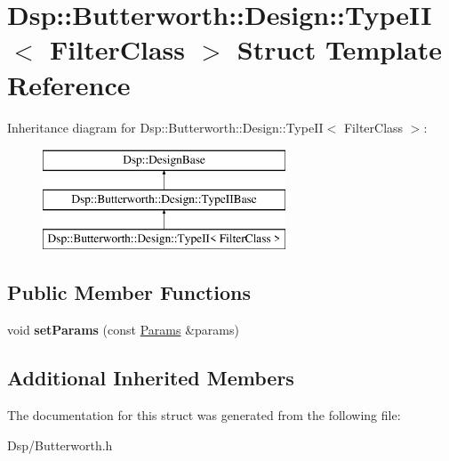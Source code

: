 \hypertarget{structDsp_1_1Butterworth_1_1Design_1_1TypeII}{\section{Dsp\-:\-:Butterworth\-:\-:Design\-:\-:Type\-I\-I$<$ Filter\-Class $>$ Struct Template Reference}
\label{structDsp_1_1Butterworth_1_1Design_1_1TypeII}
}
Inheritance diagram for Dsp\-:\-:Butterworth\-:\-:Design\-:\-:Type\-I\-I$<$ Filter\-Class $>$\-:\begin{figure}[H]
\begin{center}
\leavevmode
\includegraphics[height=3.000000cm]{structDsp_1_1Butterworth_1_1Design_1_1TypeII}
\end{center}
\end{figure}
\subsection*{Public Member Functions}
\begin{DoxyCompactItemize}
\item 
\hypertarget{structDsp_1_1Butterworth_1_1Design_1_1TypeII_ae8e8536f480fa739b5de745af62111fc}{void {\bfseries set\-Params} (const \hyperlink{structDsp_1_1Params}{Params} \&params)}\label{structDsp_1_1Butterworth_1_1Design_1_1TypeII_ae8e8536f480fa739b5de745af62111fc}

\end{DoxyCompactItemize}
\subsection*{Additional Inherited Members}


The documentation for this struct was generated from the following file\-:\begin{DoxyCompactItemize}
\item 
Dsp/Butterworth.\-h\end{DoxyCompactItemize}
